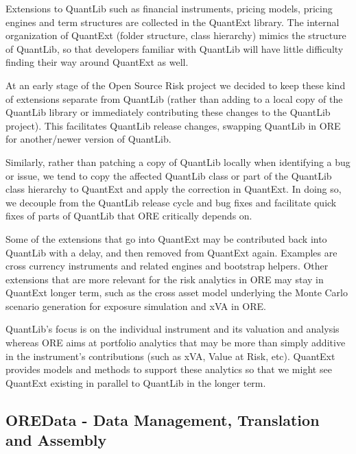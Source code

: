 \documentclass[12pt, a4paper]{report}
\begin{document}
Extensions to QuantLib such as financial instruments, pricing models, pricing engines and term structures are collected in the QuantExt library. 
The internal organization of QuantExt (folder structure, class hierarchy) mimics the structure of QuantLib, so that developers familiar with QuantLib will have little difficulty finding their way around QuantExt as well.

At an early stage of the Open Source Risk project we decided to keep these kind of extensions separate from QuantLib (rather than adding to a local copy of the QuantLib library or immediately contributing these changes to the QuantLib project).
This facilitates QuantLib release changes, swapping QuantLib in ORE for another/newer version of QuantLib.

Similarly, rather than patching a copy of QuantLib locally when identifying a bug or issue, we tend to copy the affected QuantLib class or part of the QuantLib class hierarchy to QuantExt and apply the correction in QuantExt. In doing so, we decouple
from the QuantLib release cycle and bug fixes and facilitate quick fixes of parts of QuantLib that ORE critically depends on.

Some of the extensions that go into QuantExt may be contributed back into QuantLib with a delay, and then removed from QuantExt again. Examples are cross currency instruments and related engines and bootstrap helpers. Other extensions that are more
relevant for the risk analytics in ORE may stay in QuantExt longer term, such as the cross asset model underlying the Monte Carlo scenario generation for exposure simulation and xVA in ORE.

QuantLib's focus is on the individual instrument and its valuation and analysis whereas ORE aims at portfolio analytics that may be more than simply additive in the instrument's contributions (such as xVA, Value at Risk, etc). QuantExt provides
models and methods to support these analytics so that we might see QuantExt existing in parallel to QuantLib in the longer term.

\subsection*{OREData - Data Management, Translation and Assembly}
\end{document}
